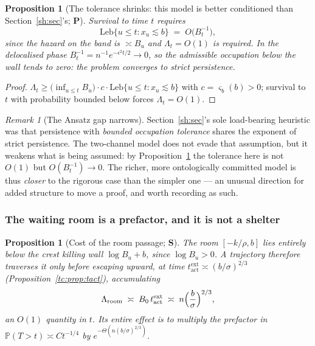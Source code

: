 \documentclass[11pt]{article}
\numberwithin{equation}{section}
\theoremstyle{plain}
\newtheorem{proposition}[theorem]{Proposition}
\theoremstyle{definition}
\theoremstyle{remark}
\newtheorem{remark}[theorem]{Remark}
\newcommand{\PP}{\mathbb{P}}
\begin{document}
\begin{proposition}[The tolerance shrinks: this model is better
conditioned than Section~\ref{sh:sec}'s; \textbf{P}]\label{tc:prop:tolerance}
Survival to time $t$ requires
\begin{equation}\label{tc:eq:tolerance}
\mathrm{Leb}\{u\le t:x_u\lesssim b\}\;=\;O\!\bigl(B_t^{-1}\bigr),
\end{equation}
since the hazard on the band is $\asymp B_u$ and $\Lambda_t=O(1)$ is
required. In the delocalised phase $B_t^{-1}=n^{-1}e^{-\epsilon^{2}t/2}
\to0$, so the admissible occupation below the wall tends to zero: the
problem converges to \emph{strict} persistence.
\end{proposition}

\begin{proof}
$\Lambda_t\ge\bigl(\inf_{u\le t}B_u\bigr)\cdot c\cdot
\mathrm{Leb}\{u\le t:x_u\lesssim b\}$ with $c=\varsigma_b(b)>0$;
survival to $t$ with probability bounded below forces $\Lambda_t=O(1)$.
\end{proof}

\begin{remark}[The Ansatz gap narrows]\label{tc:rem:gapnarrows}
Section~\ref{sh:sec}'s sole load-bearing heuristic was that persistence with
\emph{bounded occupation tolerance} shares the exponent of strict
persistence. The two-channel model does not evade that assumption, but
it weakens what is being assumed: by
Proposition~\ref{tc:prop:tolerance} the tolerance here is not $O(1)$ but
$O(B_t^{-1})\to0$. The richer, more ontologically committed model is
thus \emph{closer} to the rigorous case than the simpler one --- an
unusual direction for added structure to move a proof, and worth
recording as such.
\end{remark}

\subsubsection{The waiting room is a prefactor, and it is not a
shelter}\label{tc:subsub:roomcost}

\begin{proposition}[Cost of the room passage; \textbf{S}]
\label{tc:prop:roomcost}
The room $[-k/\rho,b]$ lies entirely below the crest killing wall
$\log B_u+b$, since $\log B_u>0$. A trajectory therefore traverses it
only before escaping upward, at time
$t^{\mathrm{ext}}_{\mathrm{act}}\asymp(b/\sigma)^{2/3}$
(Proposition~\ref{tc:prop:tact}), accumulating
\begin{equation}\label{tc:eq:roomcost}
\Lambda_{\mathrm{room}}\;\asymp\;
B_0\,t^{\mathrm{ext}}_{\mathrm{act}}
\;\asymp\;n\Bigl(\frac{b}{\sigma}\Bigr)^{2/3},
\end{equation}
an $O(1)$ quantity in $t$. Its entire effect is to multiply the
prefactor in $\PP(T>t)\asymp Ct^{-1/4}$ by
$e^{-\Theta\left(n(b/\sigma)^{2/3}\right)}$.
\end{proposition}
\end{document}
